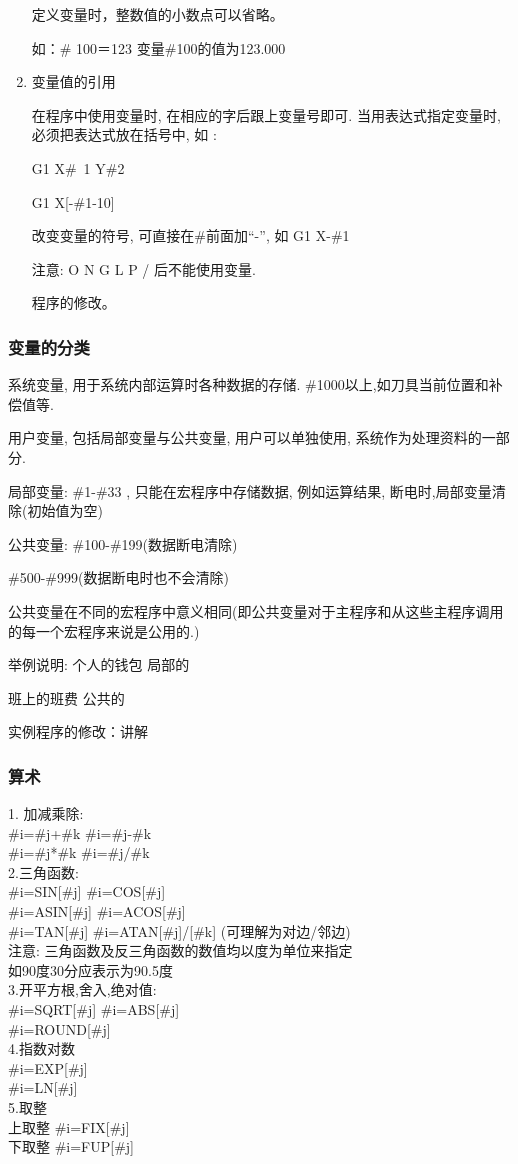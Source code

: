 \begin{enumerate}[1、]
定义变量时，整数值的小数点可以省略。

如：\# 100＝123   变量\#100的值为123.000

\item 变量值的引用

在程序中使用变量时, 在相应的字后跟上变量号即可. 当用表达式指定变量时, 必须把表达式放在括号中, 如
:

G1 X\#\ 1 Y\#2


G1 X[-\#1-10] 


改变变量的符号, 可直接在\#前面加“-”, 如 G1 X-\#1


注意: O N G L P / 后不能使用变量.


程序的修改。
\end{enumerate}

\subsubsection{变量的分类} 
系统变量, 用于系统内部运算时各种数据的存储. \#1000以上,如刀具当前位置和补偿值等.


用户变量, 包括局部变量与公共变量, 用户可以单独使用, 系统作为处理资料的一部分.


局部变量: \#1-\#33 , 只能在宏程序中存储数据, 例如运算结果, 断电时,局部变量清除(初始值为空)


公共变量: \#100-\#199(数据断电清除)


\#500-\#999(数据断电时也不会清除)


公共变量在不同的宏程序中意义相同(即公共变量对于主程序和从这些主程序调用的每一个宏程序来说是公用的.)


举例说明:  个人的钱包   局部的


班上的班费   公共的


实例程序的修改：讲解

\subsubsection{算术} 

1. 加减乘除:
\\
\#i=\#j+\#k           \#i=\#j-\#k
\\
\#i=\#j*\#k           \#i=\#j/\#k
 \\
2.三角函数:
\\
\#i=SIN[\#j]          \#i=COS[\#j]
\\
\#i=ASIN[\#j]         \#i=ACOS[\#j]
\\
\#i=TAN[\#j]         \#i=ATAN[\#j]/[\#k] (可理解为对边/邻边)
\\
注意: 三角函数及反三角函数的数值均以度为单位来指定
\\
如90度30分应表示为90.5度
\\
3.开平方根,舍入,绝对值:
\\
\#i=SQRT[\#j]        \#i=ABS[\#j]
\\
\#i=ROUND[\#j]
\\
4.指数对数
\\
\#i=EXP[\#j]
\\
\#i=LN[\#j]
\\
5.取整
\\
上取整  \#i=FIX[\#j]
\\
下取整  \#i=FUP[\#j]\\
